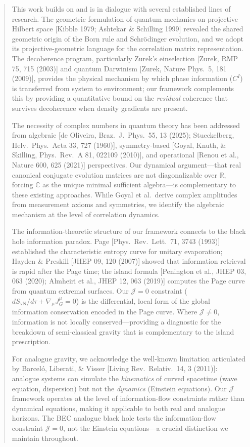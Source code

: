 \documentclass[11pt,a4paper]{article}
\begin{document}
\begin{quote}
\small
This work builds on and is in dialogue with several established lines of research. The geometric formulation of quantum mechanics on projective Hilbert space [Kibble 1979; Ashtekar \& Schilling 1999] revealed the shared geometric origin of the Born rule and Schr\"odinger evolution, and we adopt its projective-geometric language for the correlation matrix representation. The decoherence program, particularly Zurek's einselection [Zurek, RMP 75, 715 (2003)] and quantum Darwinism [Zurek, Nature Phys.\ 5, 181 (2009)], provides the physical mechanism by which phase information ($C^I$) is transferred from system to environment; our framework complements this by providing a quantitative bound on the \emph{residual} coherence that survives decoherence when density gradients are present.

The necessity of complex numbers in quantum theory has been addressed from algebraic [de Oliveira, Braz.\ J.\ Phys.\ 55, 13 (2025); Stueckelberg, Helv.\ Phys.\ Acta 33, 727 (1960)], symmetry-based [Goyal, Knuth, \& Skilling, Phys.\ Rev.\ A 81, 022109 (2010)], and operational [Renou et al., Nature 600, 625 (2021)] perspectives. Our dynamical argument---that real canonical conjugate evolution matrices are not diagonalizable over $\mathbb{R}$, forcing $\mathbb{C}$ as the unique minimal sufficient algebra---is complementary to these existing approaches. While Goyal et al.\ derive complex amplitudes from measurement axioms and symmetries, we identify the algebraic mechanism at the level of correlation dynamics.

The information-theoretic structure of our framework connects to the black hole information paradox. Page [Phys.\ Rev.\ Lett.\ 71, 3743 (1993)] established the characteristic entropy curve for unitary evaporation; Hayden \& Preskill [JHEP 09, 120 (2007)] showed that information retrieval is rapid after the Page time; the island formula [Penington et al., JHEP 03, 063 (2020); Almheiri et al., JHEP 12, 063 (2019)] computes the Page curve from quantum extremal surfaces. Our $\mathcal{J}=0$ constraint ($dS_{\text{vN}}/d\tau + \nabla_\mu J^\mu_G = 0$) is the differential, local form of the global information conservation encoded in the Page curve. Where $\mathcal{J} \neq 0$, information is not locally conserved---providing a diagnostic for the breakdown of semi-classical gravity that is complementary to the island prescription.

For analogue gravity, we acknowledge the well-known limitation articulated by Barcel\'o, Liberati, \& Visser [Living Rev.\ Relativ.\ 14, 3 (2011)]: analogue systems can simulate the \emph{kinematics} of curved spacetime (wave equation, dispersion) but not the \emph{dynamics} (Einstein equations). Our $\mathcal{J}$ framework operates at the level of information-flow constraints rather than dynamical equations, making it applicable to both real and analogue horizons. The BEC analogue black hole tests the information-flow constraint $\mathcal{J}=0$, not the Einstein equations---a crucial distinction we maintain throughout.
\end{quote}
\end{document}
